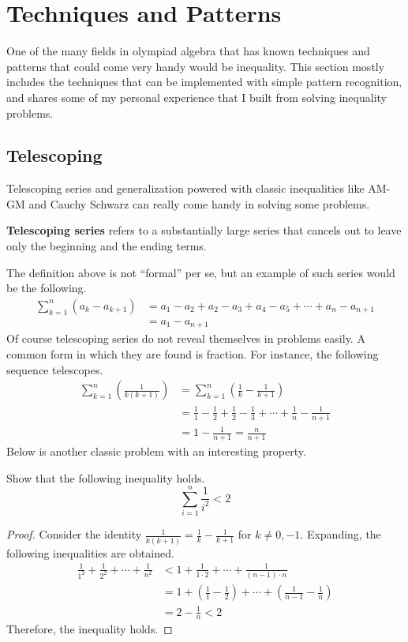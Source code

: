 \documentclass[../../main.tex]{subfiles}
\begin{document}
\section{Techniques and Patterns}

One of the many fields in olympiad algebra that has known techniques
and patterns that could come very handy would be inequality.
This section mostly includes the techniques that can be implemented
with simple pattern recognition, and shares some of my personal
experience that I built from solving inequality problems.

\subsection{Telescoping}

Telescoping series and generalization powered with classic
inequalities like AM-GM and Cauchy Schwarz can really come handy
in solving some problems.

\begin{definition}{}{}
\textbf{Telescoping series} refers to a substantially large series
that cancels out to leave only the beginning and the ending terms.
\end{definition}

The definition above is not ``formal'' per se, but an example of such
series would be the following.
\begin{align*}
    \sum_{k=1}^n (a_k - a_{k+1})
    &= a_1 - a_2 + a_2 - a_3 + a_4 - a_5 + \cdots + a_n - a_{n+1} \\
    &= a_1 - a_{n+1}
\end{align*}
Of course telescoping series do not reveal themselves in problems
easily. A common form in which they are found is fraction.
For instance, the following sequence telescopes.
\begin{align*}
\sum_{k=1}^n \left( \frac{1}{k(k + 1)} \right)
&= \sum_{k=1}^n \left( \frac{1}{k} - \frac{1}{k + 1} \right) \\
&= \frac{1}{1} - \frac{1}{2} + \frac{1}{2} - \frac{1}{3} + \cdots
    + \frac{1}{n} - \frac{1}{n + 1} \\
&= 1 - \frac{1}{n + 1}
= \frac{n}{n + 1}
\end{align*}
Below is another classic problem with an interesting property.
\begin{problem}{}{}
Show that the following inequality holds.
\[
\sum_{i = 1}^n \frac{1}{i^2} < 2
\]
\end{problem}
\begin{proof}
Consider the identity $\frac{1}{k(k + 1)} = \frac{1}{k} -
\frac{1}{k + 1}$ for $k \neq 0, -1$. Expanding, the following
inequalities are obtained.
\begin{align*}
    \frac{1}{1^2} + \frac{1}{2^2} + \cdots + \frac{1}{n^2}
    &< 1 + \frac{1}{1 \cdot 2} + \cdots + \frac{1}{(n - 1) \cdot n} \\
    &= 1 + \left( \frac{1}{1} - \frac{1}{2} \right) + \cdots
        + \left( \frac{1}{n - 1} - \frac{1}{n} \right) \\
    &= 2 - \frac{1}{n} < 2
\end{align*}
Therefore, the inequality holds.
\end{proof}
\end{document}
